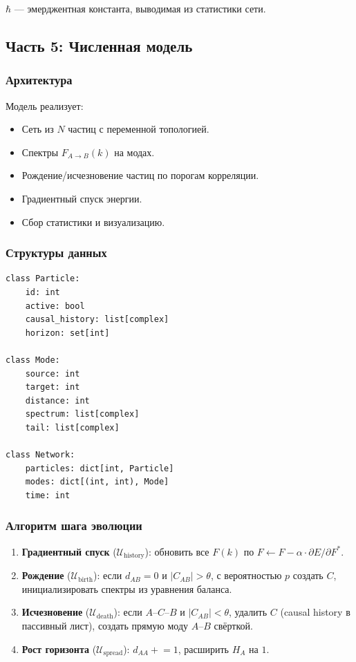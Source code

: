 \documentclass[12pt,a4paper]{article}
\begin{document}
$\hbar$ --- эмерджентная константа, выводимая из статистики сети.

\subsection{Часть 5: Численная модель}

\subsubsection{Архитектура}

Модель реализует:
\begin{itemize}
    \item Сеть из $N$ частиц с переменной топологией.
    \item Спектры $F_{A \to B}(k)$ на модах.
    \item Рождение/исчезновение частиц по порогам корреляции.
    \item Градиентный спуск энергии.
    \item Сбор статистики и визуализацию.
\end{itemize}

\subsubsection{Структуры данных}

\begin{verbatim}
class Particle:
    id: int
    active: bool
    causal_history: list[complex]
    horizon: set[int]

class Mode:
    source: int
    target: int
    distance: int
    spectrum: list[complex]
    tail: list[complex]

class Network:
    particles: dict[int, Particle]
    modes: dict[(int, int), Mode]
    time: int
\end{verbatim}

\subsubsection{Алгоритм шага эволюции}

\begin{enumerate}
    \item \textbf{Градиентный спуск} ($\mathcal{U}_{\text{history}}$): обновить все $F(k)$ по $F \leftarrow F - \alpha \cdot \partial E/\partial F^*$.
    \item \textbf{Рождение} ($\mathcal{U}_{\text{birth}}$): если $d_{AB} = 0$ и $|C_{AB}| > \theta$, с вероятностью $p$ создать $C$, инициализировать спектры из уравнения баланса.
    \item \textbf{Исчезновение} ($\mathcal{U}_{\text{death}}$): если $A$--$C$--$B$ и $|C_{AB}| < \theta$, удалить $C$ (causal history в пассивный лист), создать прямую моду $A$--$B$ свёрткой.
    \item \textbf{Рост горизонта} ($\mathcal{U}_{\text{spread}}$): $d_{AA} \mathrel{+}= 1$, расширить $H_A$ на $1$.
\end{enumerate}
\end{document}
